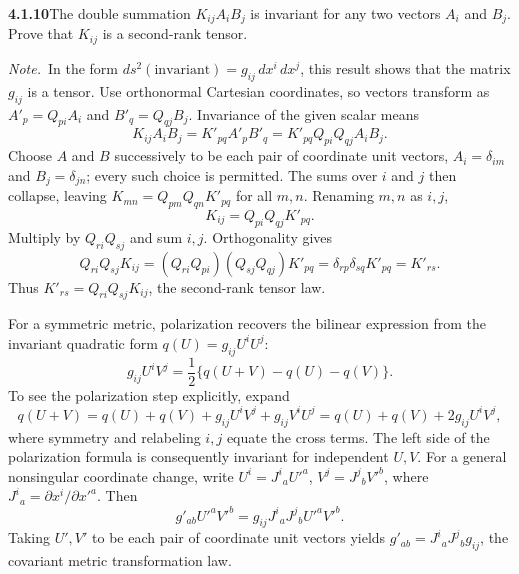 \par\bigskip
\noindent\textbf{4.1.10}\quad The double summation $K_{ij}A_{i}B_{j}$ is
invariant for any two vectors $A_{i}$ and $B_{j}$. Prove that $K_{ij}$ is a
second-rank tensor.

\emph{Note.}~In the form $ds^{2}(\text{invariant})=g_{ij}\,dx^{i}\,dx^{j}$,
this result shows that the  matrix $g_{ij}$ is a tensor.
\solution
Use orthonormal Cartesian coordinates, so vectors transform as
$A'_p=Q_{pi}A_i$ and $B'_q=Q_{qj}B_j$. Invariance of the given scalar
means
\[
K_{ij}A_iB_j
=K'_{pq}A'_pB'_q
=K'_{pq}Q_{pi}Q_{qj}A_iB_j.
\]
Choose $A$ and $B$ successively to be each pair of coordinate unit
vectors, $A_i=\delta_{im}$ and $B_j=\delta_{jn}$; every such choice is
permitted. The sums over $i$ and $j$ then collapse, leaving
$K_{mn}=Q_{pm}Q_{qn}K'_{pq}$ for all $m,n$. Renaming $m,n$ as $i,j$,
\[
K_{ij}=Q_{pi}Q_{qj}K'_{pq}.
\]
Multiply by $Q_{ri}Q_{sj}$ and sum $i,j$. Orthogonality gives
\[
Q_{ri}Q_{sj}K_{ij}
=(Q_{ri}Q_{pi})(Q_{sj}Q_{qj})K'_{pq}
=\delta_{rp}\delta_{sq}K'_{pq}=K'_{rs}.
\]
Thus $K'_{rs}=Q_{ri}Q_{sj}K_{ij}$, the second-rank tensor law.

For a symmetric metric, polarization recovers the bilinear expression
from the invariant quadratic form $q(U)=g_{ij}U^iU^j$:
\[
g_{ij}U^iV^j=\frac12\{q(U+V)-q(U)-q(V)\}.
\]
To see the polarization step explicitly, expand
\[
q(U+V)=q(U)+q(V)+g_{ij}U^iV^j+g_{ij}V^iU^j
=q(U)+q(V)+2g_{ij}U^iV^j,
\]
where symmetry and relabeling $i,j$ equate the cross terms.
The left side of the polarization formula is consequently invariant for
independent $U,V$. For a general nonsingular coordinate change, write
$U^i=J^i{}_aU'^a$, $V^j=J^j{}_bV'^b$, where
$J^i{}_a=\partial x^i/\partial x'^a$. Then
\[
g'_{ab}U'^aV'^b
=g_{ij}J^i{}_aJ^j{}_bU'^aV'^b.
\]
Taking $U',V'$ to be each pair of coordinate unit vectors yields
$g'_{ab}=J^i{}_aJ^j{}_b g_{ij}$, the covariant metric transformation law.

